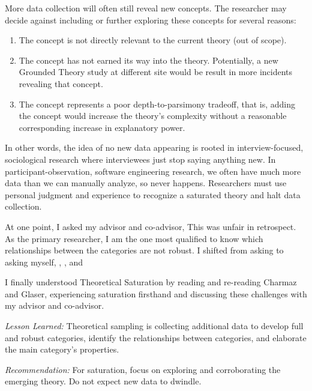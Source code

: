 More data collection will often still reveal new concepts. The researcher may decide against including or further exploring these concepts for several reasons:
\begin{enumerate}
  \item The concept is not directly relevant to the current theory (out of scope).
  \item The concept has not earned its way into the theory. Potentially, a new Grounded Theory study at different site would be result in more incidents revealing that concept. 
  \item The concept represents a poor depth-to-parsimony tradeoff, that is, adding the concept would increase the theory's complexity without a reasonable corresponding increase in explanatory power. 
\end{enumerate}

In other words, the idea of no new data appearing is rooted in interview-focused, sociological research where interviewees just stop saying anything new. In participant-observation, software engineering research, we often have much more data than we can manually analyze, so  never happens. Researchers must use personal judgment and experience to recognize a saturated theory and halt data collection.   

At one point, I asked my advisor and co-advisor,  This was unfair in retrospect. As the primary researcher, I am the one most qualified to know which relationships between the categories are not robust. I shifted from asking  to asking myself, , , and 

I finally understood Theoretical Saturation by reading and re-reading Charmaz and Glaser, experiencing saturation firsthand and discussing these challenges with my advisor and co-advisor. 

\textit{Lesson Learned:} Theoretical sampling is collecting additional data to develop full and robust categories, identify the relationships between categories, and elaborate the main category's properties.

\textit{Recommendation:} For saturation, focus on exploring and corroborating the emerging theory. Do not expect new data to dwindle.  
